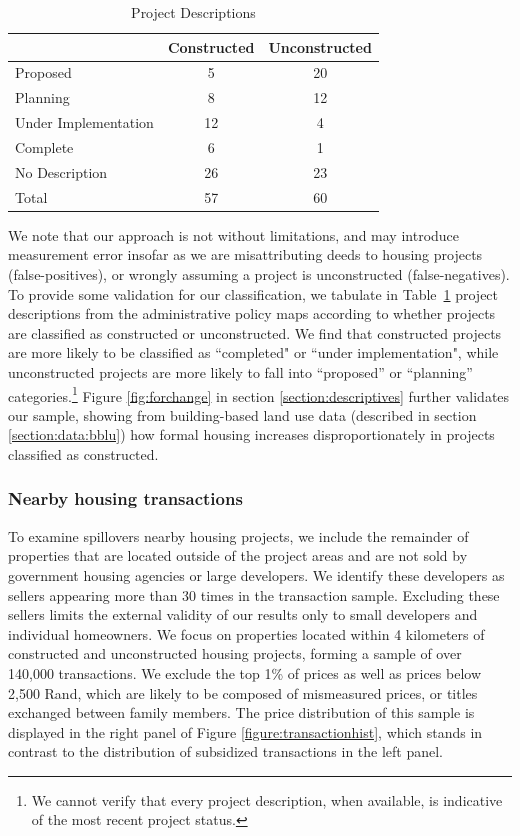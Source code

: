 \documentclass[12pt]{article}
\begin{document}
\begin{table}[h!]
\centering
\caption{Project Descriptions}\label{table:projectdescriptions}
\vspace{-2mm}
\begin{tabular}{l*{1}{cc}}
\toprule
 &Constructed &Unconstructed  \\
\midrule
Proposed   &          5  &    20  \\
Planning   &          8  &    12  \\
Under Implementation& 12 &     4  \\
Complete   &          6  &     1  \\
No Description &     26  &    23  \\ 
Total             &  57  &    60  \\
\bottomrule
\end{tabular}
\end{table}

We note that our approach is not without limitations, and may introduce measurement error insofar as we are misattributing deeds to housing projects (false-positives), or wrongly assuming a project is unconstructed (false-negatives). To provide some validation for our classification, we tabulate in Table~\ref{table:projectdescriptions} project descriptions from the administrative policy maps according to whether projects are classified as constructed or unconstructed. We find that constructed projects are more likely to be classified as ``completed" or ``under implementation", while unconstructed projects are more likely to fall into ``proposed'' or ``planning'' categories.\footnote{We cannot verify that every project description, when available, is indicative of the most recent project status.} Figure \ref{fig:forchange} in section \ref{section:descriptives} further validates our sample, showing from building-based land use data (described in section \ref{section:data:bblu}) how formal housing increases disproportionately in projects classified as constructed. 


\subsubsection*{Nearby housing transactions}

To examine spillovers nearby housing projects, we include the remainder of properties that are located outside of the project areas and are not sold by government housing agencies or large developers.  We identify these developers as sellers appearing more than 30 times in the transaction sample.  Excluding these sellers limits the external validity of our results only to small developers and individual homeowners.  We focus on properties located within 4 kilometers of constructed and unconstructed housing projects, forming a sample of over 140,000 transactions.  We exclude the top 1\% of prices as well as prices below 2,500 Rand, which are likely to be composed of mismeasured prices, or titles exchanged between family members. The price distribution of this sample is displayed in the right panel of Figure \ref{figure:transactionhist}, which stands in contrast to the distribution of subsidized transactions in the left panel. 
\end{document}
